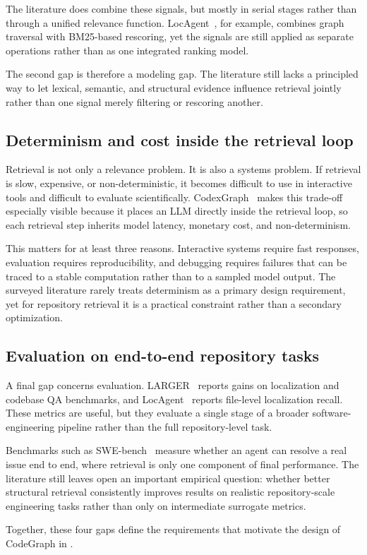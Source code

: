 The literature does combine these signals, but mostly in serial stages rather than through a unified relevance function. LocAgent~\cite{chen2025locagent}, for example, combines graph traversal with BM25-based rescoring, yet the signals are still applied as separate operations rather than as one integrated ranking model.

The second gap is therefore a modeling gap. The literature still lacks a principled way to let lexical, semantic, and structural evidence influence retrieval jointly rather than one signal merely filtering or rescoring another.

\subsection{Determinism and cost inside the retrieval loop}

Retrieval is not only a relevance problem. It is also a systems problem. If retrieval is slow, expensive, or non-deterministic, it becomes difficult to use in interactive tools and difficult to evaluate scientifically. CodexGraph~\cite{liu2024codexgraph} makes this trade-off especially visible because it places an LLM directly inside the retrieval loop, so each retrieval step inherits model latency, monetary cost, and non-determinism.

This matters for at least three reasons. Interactive systems require fast responses, evaluation requires reproducibility, and debugging requires failures that can be traced to a stable computation rather than to a sampled model output. The surveyed literature rarely treats determinism as a primary design requirement, yet for repository retrieval it is a practical constraint rather than a secondary optimization.

\subsection{Evaluation on end-to-end repository tasks}

A final gap concerns evaluation. LARGER~\cite{hu2026larger} reports gains on localization and codebase QA benchmarks, and LocAgent~\cite{chen2025locagent} reports file-level localization recall. These metrics are useful, but they evaluate a single stage of a broader software-engineering pipeline rather than the full repository-level task.

Benchmarks such as SWE-bench~\cite{yang2024swebench} measure whether an agent can resolve a real issue end to end, where retrieval is only one component of final performance. The literature still leaves open an important empirical question: whether better structural retrieval consistently improves results on realistic repository-scale engineering tasks rather than only on intermediate surrogate metrics.

Together, these four gaps define the requirements that motivate the design of CodeGraph in .